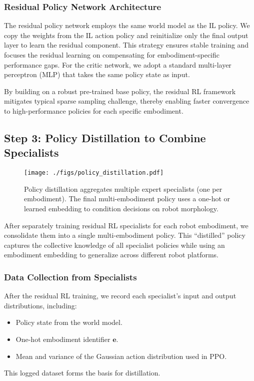 \documentclass[letterpaper, 10 pt,conference]{ieeeconf}
\begin{document}
\subsubsection{Residual Policy Network Architecture}
The residual policy network employs the same world model as the IL policy. We copy the weights from the IL action policy and reinitialize only the final output layer to learn the residual component. This strategy ensures stable training and focuses the residual learning on compensating for embodiment-specific performance gaps. For the critic network, we adopt a standard multi-layer perceptron (MLP) that takes the same policy state as input.

By building on a robust pre-trained base policy, the residual RL framework mitigates typical sparse sampling challenge, thereby enabling faster convergence to high-performance policies for each specific embodiment.

\subsection{Step 3: Policy Distillation to Combine Specialists}
\label{sec:distillation}


\begin{figure}[t]
\begin{center}
\centering\texttt{[image: ./figs/policy\_distillation.pdf]}
\caption{Policy distillation aggregates multiple expert specialists (one per embodiment). The final multi-embodiment policy uses a one-hot or learned embedding to condition decisions on robot morphology.}
\label{fig:policy_distillation}
\end{center}
\end{figure}

After separately training residual RL specialists for each robot embodiment, we consolidate them into a single multi-embodiment policy. This “distilled” policy captures the collective knowledge of all specialist policies while using an embodiment embedding to generalize across different robot platforms.

\subsubsection{Data Collection from Specialists}
After the residual RL training, we record each specialist’s input and output distributions, including:
\begin{itemize}
    \item Policy state from the world model.
    \item One-hot embodiment identifier $\mathbf{e}$.
    \item Mean and variance of the Gaussian action distribution used in PPO.
\end{itemize}
This logged dataset forms the basis for distillation.
\end{document}
